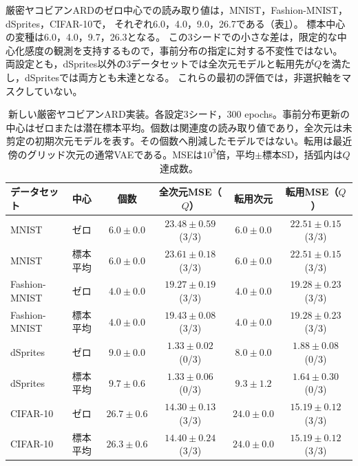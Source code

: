 \documentclass[11pt,a4paper]{ltjsarticle}
\begin{document}
厳密ヤコビアンARDのゼロ中心での読み取り値は，MNIST，Fashion-MNIST，dSprites，CIFAR-10で，
それぞれ6.0，4.0，9.0，26.7である（表\ref{tab:ardnew}）。
標本中心の変種は6.0，4.0，9.7，26.3となる。
この3シードでの小さな差は，限定的な中心化感度の観測を支持するもので，事前分布の指定に対する不変性ではない。
両設定とも，dSprites以外の3データセットでは全次元モデルと転用先が$Q$を満たし，dSpritesでは両方とも未達となる。
これらの最初の評価では，非選択軸をマスクしていない。
\begin{table}[H]
\caption{新しい厳密ヤコビアンARD実装。各設定3シード，300 epochs。事前分布更新の中心はゼロまたは潜在標本平均。個数は関連度の読み取り値であり，全次元は未剪定の初期次元モデルを表す。その個数へ削減したモデルではない。転用は最近傍のグリッド次元の通常VAEである。MSEは$10^3$倍，平均$\pm$標本SD，括弧内は$Q$達成数。}\label{tab:ardnew}
\footnotesize
\setlength{\tabcolsep}{3pt}
\begin{tabular*}{\textwidth}{@{\extracolsep{\fill}}llcccc@{}}
\toprule
データセット & 中心 & 個数 & 全次元MSE（$Q$） & 転用次元 & 転用MSE（$Q$） \\
\midrule
MNIST & ゼロ & $6.0 \pm 0.0$ & $23.48 \pm 0.59$ (3/3) & $6.0 \pm 0.0$ & $22.51 \pm 0.15$ (3/3) \\
MNIST & 標本平均 & $6.0 \pm 0.0$ & $23.61 \pm 0.18$ (3/3) & $6.0 \pm 0.0$ & $22.51 \pm 0.15$ (3/3) \\
Fashion-MNIST & ゼロ & $4.0 \pm 0.0$ & $19.27 \pm 0.19$ (3/3) & $4.0 \pm 0.0$ & $19.28 \pm 0.23$ (3/3) \\
Fashion-MNIST & 標本平均 & $4.0 \pm 0.0$ & $19.43 \pm 0.08$ (3/3) & $4.0 \pm 0.0$ & $19.28 \pm 0.23$ (3/3) \\
dSprites & ゼロ & $9.0 \pm 0.0$ & $1.33 \pm 0.02$ (0/3) & $8.0 \pm 0.0$ & $1.88 \pm 0.08$ (0/3) \\
dSprites & 標本平均 & $9.7 \pm 0.6$ & $1.33 \pm 0.06$ (0/3) & $9.3 \pm 1.2$ & $1.64 \pm 0.30$ (0/3) \\
CIFAR-10 & ゼロ & $26.7 \pm 0.6$ & $14.30 \pm 0.13$ (3/3) & $24.0 \pm 0.0$ & $15.19 \pm 0.12$ (3/3) \\
CIFAR-10 & 標本平均 & $26.3 \pm 0.6$ & $14.40 \pm 0.24$ (3/3) & $24.0 \pm 0.0$ & $15.19 \pm 0.12$ (3/3) \\
\bottomrule\end{tabular*}
\end{table}
\end{document}
